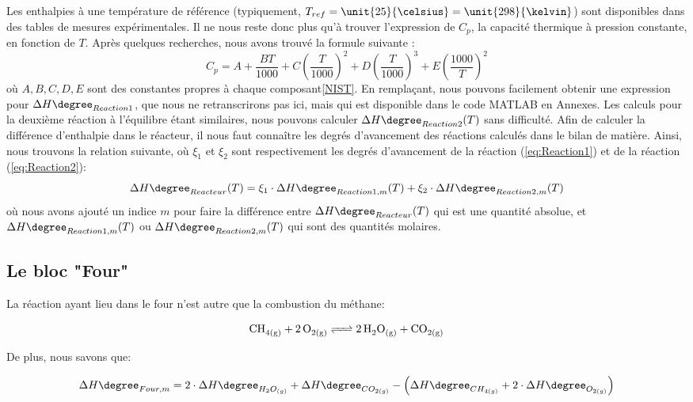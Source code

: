 Les enthalpies à une température de référence (typiquement, $T_{ref}=\unit{25}{\celsius}=\unit{298}{\kelvin}$) sont
disponibles dans des tables de mesures expérimentales. Il ne nous reste donc plus qu'à trouver
l'expression de $C_p$, la capacité thermique à pression constante, en fonction de $T$.
Après quelques recherches, nous avons trouvé la formule suivante \cite{NIST}: \begin{equation}\label{eqref:capacite}
C_p=A+\dfrac{BT}{1000}+C\left(\dfrac{T}{1000}\right)^2+D\left(\dfrac{T}{1000}\right)^3+E\left(\dfrac{1000}{T}\right)^2
\end{equation} où $A,B,C,D,E$ sont des constantes propres à chaque composant\ref{NIST}.
En remplaçant, nous pouvons facilement obtenir une expression pour $\Delta H\degree_{Reaction1}$, que nous ne retranscrirons pas
ici, mais qui est disponible dans le code \textsc{MATLAB} en Annexes. 
Les calculs pour la deuxième réaction à l'équilibre étant similaires, nous pouvons
calculer $\Delta H\degree_{Reaction2}(T)$ sans difficulté. Afin de calculer la différence d'enthalpie dans le réacteur,
il nous faut connaître les degrés d'avancement des réactions calculés dans le bilan de matière. Ainsi, nous
trouvons la relation suivante, où $\xi_1$ et $\xi_2$ sont respectivement les degrés d'avancement de la
réaction (\ref{eq:Reaction1}) et de la réaction (\ref{eq:Reaction2}):
\begin{equation}\label{eq:deltaHreacteur}{\Delta H\degree_{Reacteur}(T)=\xi_1\cdot\Delta H\degree_{Reaction1,m}(T)+\xi_2\cdot\Delta H\degree_{Reaction2,m}(T)}\end{equation}
où nous avons ajouté un indice $m$ pour faire la différence entre $\Delta H\degree_{Reacteur}(T)$ qui est une quantité absolue, 
et $\Delta H\degree_{Reaction1,m}(T)$ ou $\Delta H\degree_{Reaction2,m}(T)$ qui sont des quantités molaires.

\newpage

\subsection{Le bloc "Four"}
La réaction ayant lieu dans le four n'est autre que la combustion du méthane:

\begin{equation}\label{combust.methane}\ce{CH_{4(g)} + 2O_{2(g)} <=> 2H_2O_{(g)} + CO_{2(g)}}\end{equation}

De plus, nous savons que:

$$\Delta H\degree_{Four,m} = 2\cdot \Delta H\degree_{H_{2}O_{(g)}} + \Delta H\degree_{CO_{2(g)}}
- \left(\Delta H\degree_{CH_{4(g)}} + 2\cdot \Delta H\degree_{O_{2(g)}}\right)$$

